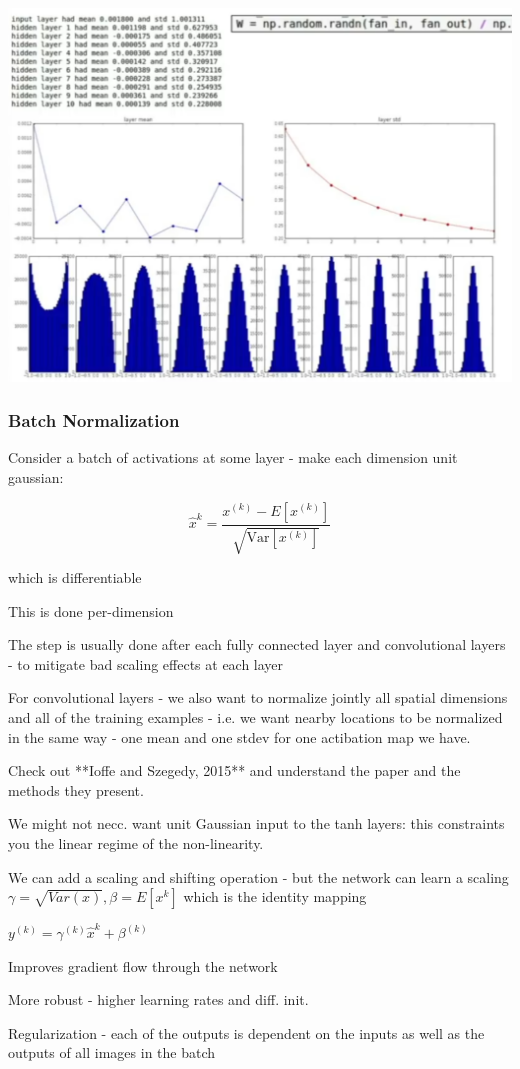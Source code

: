     \includegraphics[width=0.5\columnwidth]{fei_fei_li/lecture_06/xavier_init_vis.png}

\subsubsection{Batch Normalization}

Consider a batch of activations at  some layer - make each dimension unit gaussian:

$$\hat x^k = \frac{x^{(k)} - E[x^{(k)}] }{\sqrt{\text{Var}[x^(k)]}} $$

which is differentiable

This is done per-dimension

The step is usually done after each fully connected layer and convolutional layers - to mitigate bad scaling effects at each layer

For convolutional layers - we also want to normalize jointly all spatial dimensions and all of the training examples - i.e. we want nearby locations to be normalized in the same way - one mean and one stdev for one actibation map we have. 

Check out **Ioffe and Szegedy, 2015** and understand the paper and the methods they present. 

We might not necc. want unit Gaussian input to the tanh layers: this constraints you the linear regime of the non-linearity.



We can add a scaling and shifting operation - but the network can learn a scaling $\gamma = \sqrt{Var(x)}, \beta = E[x^k]$ which is the identity mapping

$y^{(k)} = \gamma^{(k)}\hat{x}^k + \beta^{(k)} $

Improves gradient flow through the network 

More robust - higher learning rates and diff. init.

Regularization - each of the outputs is dependent on the inputs as well as the outputs of all images in the batch



